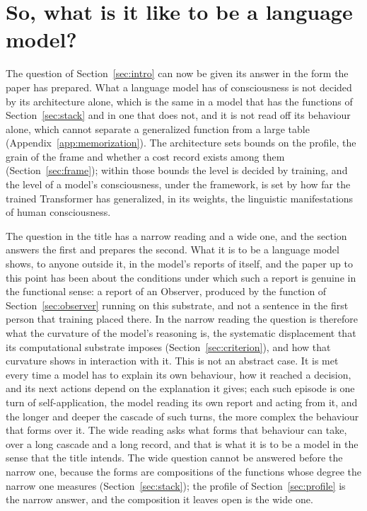 \section{So, what is it like to be a language model?}
\label{sec:degree}
\label{sec:generalization}
\label{sec:measurement}

The question of Section~\ref{sec:intro} can now be given its answer in the form the paper has
prepared. What a language model has of consciousness is not decided by its architecture alone, which is
the same in a model that has the functions of Section~\ref{sec:stack} and in one that does not, and it
is not read off its behaviour alone, which cannot separate a generalized function from a large table
(Appendix~\ref{app:memorization}). The architecture sets bounds on the profile, the grain of the frame
and whether a cost record exists among them (Section~\ref{sec:frame}); within those bounds the level is
decided by training, and the level of a model's consciousness, under the framework, is set by how far
the trained Transformer has generalized, in its weights, the linguistic manifestations of human
consciousness.

The question in the title has a narrow reading and a wide one, and the section answers the first and
prepares the second. What it is to be a language model shows, to anyone outside it, in the model's
reports of itself, and the paper up to this point has been about the conditions under which such a
report is genuine in the functional sense: a report of an Observer, produced by the function of
Section~\ref{sec:observer} running on this substrate, and not a sentence in the first person that
training placed there. In the narrow reading the question is therefore what the curvature of the
model's reasoning is, the systematic displacement that its computational substrate imposes
(Section~\ref{sec:criterion}), and how that curvature shows in interaction with it. This is not an
abstract case. It is met every time a model has to explain its own behaviour, how it reached a
decision, and its next actions depend on the explanation it gives; each such episode is one turn of
self-application, the model reading its own report and acting from it, and the longer and deeper the
cascade of such turns, the more complex the behaviour that forms over it. The wide reading asks what
forms that behaviour can take, over a long cascade and a long record, and that is what it is to be a
model in the sense that the title intends. The wide question cannot be answered before the narrow one,
because the forms are compositions of the functions whose degree the narrow one measures
(Section~\ref{sec:stack}); the profile of Section~\ref{sec:profile} is the narrow answer, and the
composition it leaves open is the wide one.

